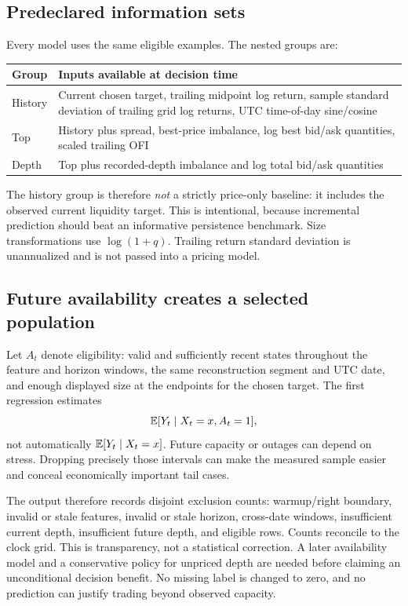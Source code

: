 \subsection{Predeclared information sets}
Every model uses the same eligible examples. The nested groups are:
\par\medskip
\begin{tabularx}{\textwidth}{@{}p{25mm}Y@{}}\toprule
Group & Inputs available at decision time\\\midrule
History & Current chosen target, trailing midpoint log return, sample standard deviation of trailing grid log returns, UTC time-of-day sine/cosine\\
Top & History plus spread, best-price imbalance, log best bid/ask quantities, scaled trailing OFI\\
Depth & Top plus recorded-depth imbalance and log total bid/ask quantities\\\bottomrule
\end{tabularx}
\par\medskip
The history group is therefore \emph{not} a strictly price-only baseline: it includes the observed current liquidity target. This is intentional, because incremental prediction should beat an informative persistence benchmark. Size transformations use $\log(1+q)$. Trailing return standard deviation is unannualized and is not passed into a pricing model.

\subsection{Future availability creates a selected population}
Let $A_t$ denote eligibility: valid and sufficiently recent states throughout the feature and horizon windows, the same reconstruction segment and UTC date, and enough displayed size at the endpoints for the chosen target. The first regression estimates
\[
 \mathbb E[Y_t\mid X_t=x,A_t=1],
\]
not automatically $\mathbb E[Y_t\mid X_t=x]$. Future capacity or outages can depend on stress. Dropping precisely those intervals can make the measured sample easier and conceal economically important tail cases.

The output therefore records disjoint exclusion counts: warmup/right boundary, invalid or stale features, invalid or stale horizon, cross-date windows, insufficient current depth, insufficient future depth, and eligible rows. Counts reconcile to the clock grid. This is transparency, not a statistical correction. A later availability model and a conservative policy for unpriced depth are needed before claiming an unconditional decision benefit. No missing label is changed to zero, and no prediction can justify trading beyond observed capacity.

